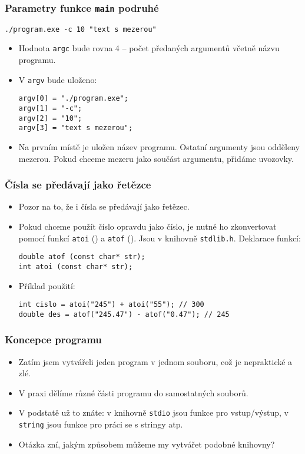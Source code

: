 \documentclass{beamer}
\newenvironment{itemizex}%
  {\large \begin{itemize}%
    \setlength{\itemsep}{8pt}%
    \setlength{\parskip}{8pt}}%
  {\end{itemize}}
\begin{document}
\begin{frame}[t,fragile]\frametitle{Parametry funkce \texttt{main} podruhé} 
\begin{verbatim} 
./program.exe -c 10 "text s mezerou"
\end{verbatim}
    \begin{itemize}
        \item Hodnota \texttt{argc} bude rovna 4 -- počet předaných argumentů včetně názvu programu. 
        \item V \texttt{argv} bude uloženo:
\begin{verbatim} 
argv[0] = "./program.exe";
argv[1] = "-c";
argv[2] = "10";
argv[3] = "text s mezerou";
\end{verbatim}
        \item Na prvním místě je uložen název programu. Ostatní argumenty jsou odděleny mezerou. Pokud chceme mezeru jako součást argumentu, přidáme uvozovky.
    \end{itemize}
\end{frame}


\begin{frame}[t,fragile]\frametitle{Čísla se předávají jako řetězce} 
    \begin{itemizex}
        \item Pozor na to, že i čísla se předávají jako řetězec.
        \item Pokud chceme použít číslo opravdu jako číslo, je nutné ho zkonvertovat pomocí funkcí \texttt{atoi} () a \texttt{atof} (). Jsou v knihovně \texttt{stdlib.h}. Deklarace funkcí:
        \begin{verbatim} 
double atof (const char* str);
int atoi (const char* str);
        \end{verbatim}
        \item Příklad použití:
\begin{verbatim} 
int cislo = atoi("245") + atoi("55"); // 300
double des = atof("245.47") - atof("0.47"); // 245
\end{verbatim}
    \end{itemizex}
\end{frame}



\begin{frame}[t,fragile]\frametitle{Koncepce programu} 
    \begin{itemizex}
        \item Zatím jsem vytvářeli jeden program v jednom souboru, což je nepraktické a zlé. 
        \item V praxi dělíme různé části programu do samostatných souborů.
        \item V podstatě už to znáte: v knihovně \texttt{stdio} jsou funkce pro vstup/výstup, v \texttt{string} jsou funkce pro práci se s stringy atp.
        \item Otázka zní, jakým způsobem můžeme my vytvářet podobné knihovny? 
    \end{itemizex}
\end{frame}
\end{document}
